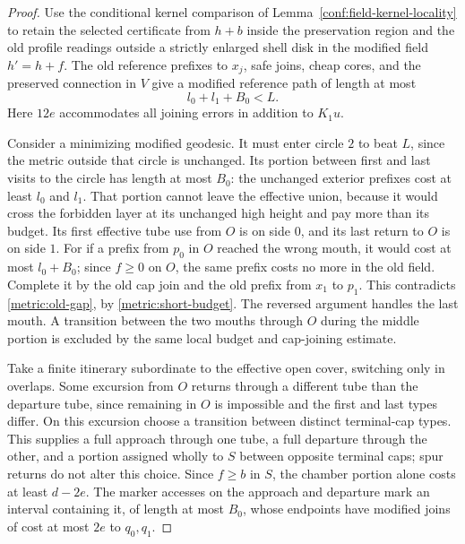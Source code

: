 \begin{proof}
Use the conditional kernel comparison of
Lemma~\ref{conf:field-kernel-locality} to
retain the selected certificate from $h+b$ inside the preservation region
and the old profile readings outside a strictly enlarged shell disk in the
modified field $h'=h+f$. The old reference prefixes to $x_j$, safe joins,
cheap cores, and the preserved connection in $V$ give a modified reference
path of length at most
\begin{equation}\label{metric:modified-upper}
 l_0+l_1+B_0<L.
\end{equation}
Here $12e$ accommodates all joining errors in addition to $K_1u$.

Consider a minimizing modified geodesic. It must enter circle $2$ to beat
$L$, since the metric outside that circle is unchanged. Its portion
between first and last visits to the circle has length at most $B_0$:
the unchanged exterior prefixes cost at least $l_0$ and $l_1$.
That portion cannot leave the effective union, because it would cross
the forbidden layer at its unchanged high height and pay more than its
budget. Its first effective tube use from $O$ is on side $0$, and its
last return to $O$ is on side $1$. For if a prefix from $p_0$ in $O$
reached the wrong mouth, it would cost at most $l_0+B_0$; since $f\ge0$
on $O$, the same prefix costs no more in the old field. Complete it by
the old cap join and the old prefix from $x_1$ to $p_1$. This contradicts
\eqref{metric:old-gap}, by \eqref{metric:short-budget}. The reversed
argument handles the last mouth. A transition between the two mouths
through $O$ during the middle portion is excluded by the same local
budget and cap-joining estimate.

Take a finite itinerary subordinate to the effective open cover, switching
only in overlaps. Some excursion from $O$ returns through a different tube
than the departure tube, since remaining in $O$ is impossible and the
first and last types differ. On this excursion choose a transition between
distinct terminal-cap types. This supplies a full approach through one
tube, a full departure through the other, and a portion assigned wholly
to $S$ between opposite terminal caps; spur returns do not alter this
choice. Since $f\ge b$ in $S$, the chamber portion alone costs at least
$d-2e$. The marker accesses on the approach and departure mark an interval
containing it, of length at most $B_0$, whose endpoints have modified joins
of cost at most $2e$ to $q_0,q_1$.


\end{proof}
